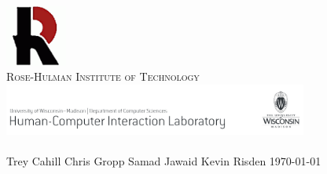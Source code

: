 \documentclass{article}
\begin{document}
\begin{titlepage}
\begin{center}
\includegraphics[width=0.15\textwidth]{../images/rh}\\[1.0cm]
\textsc{\large Rose-Hulman Institute of Technology}\\[1.5cm]
\includegraphics[width=0.75\textwidth]{../images/pss}\\[1.0cm]
\textsc{\large{\puttitle}}\\[1.0cm]
\large Trey Cahill \hspace{0.2cm} Chris Gropp \hspace{0.2cm} Samad Jawaid \hspace{0.2cm} Kevin Risden
\vfill
\large \today
\end{center}
\end{titlepage}

\tableofcontents
\newpage
\end{document}
